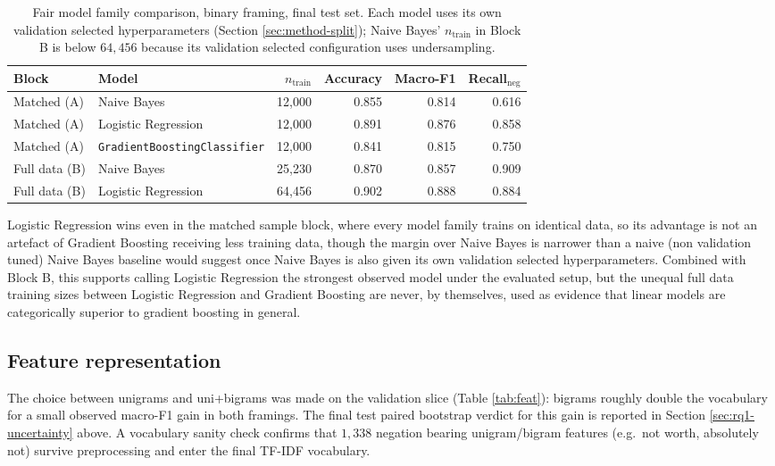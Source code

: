 \documentclass[11pt,a4paper,DIV=12]{scrartcl}
\begin{document}
\begin{table}[H]
\centering
\caption{Fair model family comparison, binary framing, final test set. Each
model uses its own validation selected hyperparameters (Section
\ref{sec:method-split}); Naive Bayes' $n_{\text{train}}$ in Block B is below
$64{,}456$ because its validation selected configuration uses undersampling.}
\label{tab:rq1fair}
\begin{tabular}{llrrrr}
\toprule
Block & Model & $n_{\text{train}}$ & Accuracy & Macro-F1 & Recall$_{\text{neg}}$ \\
\midrule
Matched (A) & Naive Bayes           & 12{,}000 & 0.855 & 0.814 & 0.616 \\
Matched (A) & Logistic Regression   & 12{,}000 & 0.891 & 0.876 & 0.858 \\
Matched (A) & \texttt{GradientBoostingClassifier} & 12{,}000 & 0.841 & 0.815 & 0.750 \\
\midrule
Full data (B) & Naive Bayes         & 25{,}230 & 0.870 & 0.857 & 0.909 \\
Full data (B) & Logistic Regression & 64{,}456 & 0.902 & 0.888 & 0.884 \\
\bottomrule
\end{tabular}
\end{table}

Logistic Regression wins even in the matched sample block, where
every model family trains on identical data, so its advantage is not an
artefact of Gradient Boosting receiving less training data, though the margin
over Naive Bayes is narrower than a naive (non validation tuned) Naive Bayes
baseline would suggest once Naive Bayes is also given its own
validation selected hyperparameters. Combined with
Block B, this supports calling Logistic Regression the strongest
observed model under the evaluated setup, but the unequal full data training
sizes between Logistic Regression and Gradient Boosting are never, by
themselves, used as evidence that linear models are categorically superior to
gradient boosting in general.

\subsection{Feature representation}
The choice between unigrams and uni+bigrams was made on the validation slice
(Table \ref{tab:feat}): bigrams roughly double the vocabulary for a small
observed macro-F1 gain in both framings. The final test paired bootstrap
verdict for this gain is reported in Section \ref{sec:rq1-uncertainty} above.
A vocabulary sanity check confirms that $1{,}338$ negation bearing unigram/bigram
features (e.g.\ not worth, absolutely not) survive preprocessing
and enter the final TF-IDF vocabulary.
\end{document}
